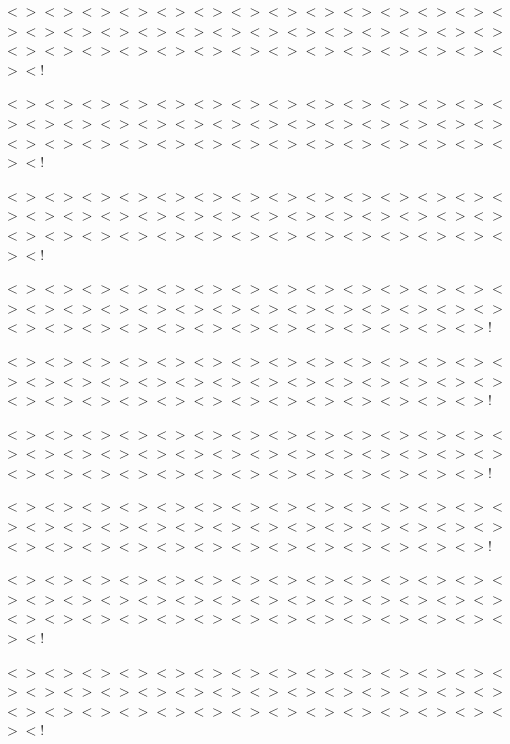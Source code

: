 $<$$>$$<$$>$$<$$>$$<$$>$$<$$>$$<$$>$$<$$>$$<$$>$$<$$>$$<$$>$$<$$>$$<$$>$$<$$>$$<$$>$$<$$>$$<$$>$$<$$>$$<$$>$$<$$>$$<$$>$$<$$>$$<$$>$$<$$>$$<$$>$$<$$>$$<$$>$$<$$>$$<$$>$$<$$>$$<$$>$$<$$>$$<$$>$$<$$>$$<$$>$$<$$>$$<$$>$$<$$>$$<$$>$$<$$>$$<$$>$$<$$>$$<$!

$<$$>$$<$$>$$<$$>$$<$$>$$<$$>$$<$$>$$<$$>$$<$$>$$<$$>$$<$$>$$<$$>$$<$$>$$<$$>$$<$$>$$<$$>$$<$$>$$<$$>$$<$$>$$<$$>$$<$$>$$<$$>$$<$$>$$<$$>$$<$$>$$<$$>$$<$$>$$<$$>$$<$$>$$<$$>$$<$$>$$<$$>$$<$$>$$<$$>$$<$$>$$<$$>$$<$$>$$<$$>$$<$$>$$<$$>$$<$$>$$<$$>$$<$!

$<$$>$$<$$>$$<$$>$$<$$>$$<$$>$$<$$>$$<$$>$$<$$>$$<$$>$$<$$>$$<$$>$$<$$>$$<$$>$$<$$>$$<$$>$$<$$>$$<$$>$$<$$>$$<$$>$$<$$>$$<$$>$$<$$>$$<$$>$$<$$>$$<$$>$$<$$>$$<$$>$$<$$>$$<$$>$$<$$>$$<$$>$$<$$>$$<$$>$$<$$>$$<$$>$$<$$>$$<$$>$$<$$>$$<$$>$$<$$>$$<$$>$$<$!

$<$$>$$<$$>$$<$$>$$<$$>$$<$$>$$<$$>$$<$$>$$<$$>$$<$$>$$<$$>$$<$$>$$<$$>$$<$$>$$<$$>$$<$$>$$<$$>$$<$$>$$<$$>$$<$$>$$<$$>$$<$$>$$<$$>$$<$$>$$<$$>$$<$$>$$<$$>$$<$$>$$<$$>$$<$$>$$<$$>$$<$$>$$<$$>$$<$$>$$<$$>$$<$$>$$<$$>$$<$$>$$<$$>$$<$$>$$<$$>$!

$<$$>$$<$$>$$<$$>$$<$$>$$<$$>$$<$$>$$<$$>$$<$$>$$<$$>$$<$$>$$<$$>$$<$$>$$<$$>$$<$$>$$<$$>$$<$$>$$<$$>$$<$$>$$<$$>$$<$$>$$<$$>$$<$$>$$<$$>$$<$$>$$<$$>$$<$$>$$<$$>$$<$$>$$<$$>$$<$$>$$<$$>$$<$$>$$<$$>$$<$$>$$<$$>$$<$$>$$<$$>$$<$$>$$<$$>$$<$$>$!

$<$$>$$<$$>$$<$$>$$<$$>$$<$$>$$<$$>$$<$$>$$<$$>$$<$$>$$<$$>$$<$$>$$<$$>$$<$$>$$<$$>$$<$$>$$<$$>$$<$$>$$<$$>$$<$$>$$<$$>$$<$$>$$<$$>$$<$$>$$<$$>$$<$$>$$<$$>$$<$$>$$<$$>$$<$$>$$<$$>$$<$$>$$<$$>$$<$$>$$<$$>$$<$$>$$<$$>$$<$$>$$<$$>$$<$$>$$<$$>$!

$<$$>$$<$$>$$<$$>$$<$$>$$<$$>$$<$$>$$<$$>$$<$$>$$<$$>$$<$$>$$<$$>$$<$$>$$<$$>$$<$$>$$<$$>$$<$$>$$<$$>$$<$$>$$<$$>$$<$$>$$<$$>$$<$$>$$<$$>$$<$$>$$<$$>$$<$$>$$<$$>$$<$$>$$<$$>$$<$$>$$<$$>$$<$$>$$<$$>$$<$$>$$<$$>$$<$$>$$<$$>$$<$$>$$<$$>$$<$$>$!

$<$$>$$<$$>$$<$$>$$<$$>$$<$$>$$<$$>$$<$$>$$<$$>$$<$$>$$<$$>$$<$$>$$<$$>$$<$$>$$<$$>$$<$$>$$<$$>$$<$$>$$<$$>$$<$$>$$<$$>$$<$$>$$<$$>$$<$$>$$<$$>$$<$$>$$<$$>$$<$$>$$<$$>$$<$$>$$<$$>$$<$$>$$<$$>$$<$$>$$<$$>$$<$$>$$<$$>$$<$$>$$<$$>$$<$$>$$<$$>$$<$$>$$<$!

$<$$>$$<$$>$$<$$>$$<$$>$$<$$>$$<$$>$$<$$>$$<$$>$$<$$>$$<$$>$$<$$>$$<$$>$$<$$>$$<$$>$$<$$>$$<$$>$$<$$>$$<$$>$$<$$>$$<$$>$$<$$>$$<$$>$$<$$>$$<$$>$$<$$>$$<$$>$$<$$>$$<$$>$$<$$>$$<$$>$$<$$>$$<$$>$$<$$>$$<$$>$$<$$>$$<$$>$$<$$>$$<$$>$$<$$>$$<$$>$$<$$>$$<$! 

